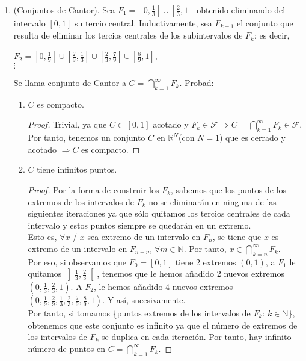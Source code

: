 \documentclass[a4paper, 11pt]{article} %
\begin{document}
\begin{enumerate}
\begin{proof}
	\end{proof}
	\item (Conjuntos de Cantor). Sea $F_1 = \displaystyle{\left[0,\frac{1}{3}\right] \cup \left[\frac{2}{3}, 1\right]}$ obtenido eliminando del intervalo $[0,1]$ su tercio central. Inductivamente, sea $F_{k+1}$ el conjunto que resulta de eliminar los tercios centrales de los subintervalos de $F_k$; es decir,
	\begin{center}
		$\displaystyle{F_2 = \left[0, \frac{1}{9}\right] \cup \left[\frac{2}{9}, \frac{1}{3}\right] \cup \left[\frac{2}{3}, \frac{7}{9}\right] \cup \left[\frac{8}{9}, 1\right]}$,\\
		$\vdots$
	\end{center}
	Se llama conjunto de Cantor a $\displaystyle{C=\bigcap_{k = 1}^\infty F_k}$. Probad:
	\begin{enumerate}[label=\alph*)]
		\item $C$ es compacto.
		\begin{proof}
			Trivial, ya que $C \subset [0,1]$ acotado y $F_k \in \mathcal{F} \Rightarrow  \displaystyle{C =\bigcap_{k=1}^\infty} F_k \in \mathcal{F}$. Por tanto, tenemos un conjunto $C$ en $\mathbb{R}^N$(con $N=1$) que es cerrado y acotado $\Rightarrow C$ es compacto.
		\end{proof}
		\item $C$ tiene infinitos puntos.
		\begin{proof}
			Por la forma de construir los $F_k$, sabemos que los puntos de los extremos de los intervalos de $F_k$ no se eliminarán en ninguna de las siguientes iteraciones ya que sólo quitamos los tercios centrales de cada intervalo y estos puntos siempre se quedarán en un extremo.\\
			Esto es, $\forall x$ / $x$ sea extremo de un intervalo en $F_n$, se tiene que $x$ es extremo de un intervalo en $F_{n+m}$ $\forall m \in \mathbb{N}$. Por tanto, $\displaystyle{x \in \bigcap_{k=n}^\infty F_k}$.\\
			Por eso, si observamos que $F_0 = [0,1]$ tiene 2 extremos $(0, 1)$, a $F_1$ le quitamos $\displaystyle{\left]\frac{1}{3}, \frac{2}{3}\right[}$, tenemos que le hemos añadido 2 nuevos extremos $\displaystyle{\left(0,\frac{1}{3}, \frac{2}{3},1\right)}$. A $F_2$, le hemos añadido 4 nuevos extremos $\displaystyle{\left(0, \frac{1}{9}, \frac{2}{9}, \frac{1}{3}, \frac{2}{3}, \frac{7}{9}, \frac{8}{9}, 1\right)}$. Y así, sucesivamente.\\
			Por tanto, si tomamos \{puntos extremos de los intervalos de $F_k$: $k \in \mathbb{N}$\}, obtenemos que este conjunto es infinito ya que el número de extremos de los intervalos de $F_k$ se duplica en cada iteración. Por tanto, hay infinito número de puntos en $\displaystyle{C = \bigcap_{k = 1}^\infty F_k}$.

\end{proof}
\end{enumerate}
\end{enumerate}
\end{document}
